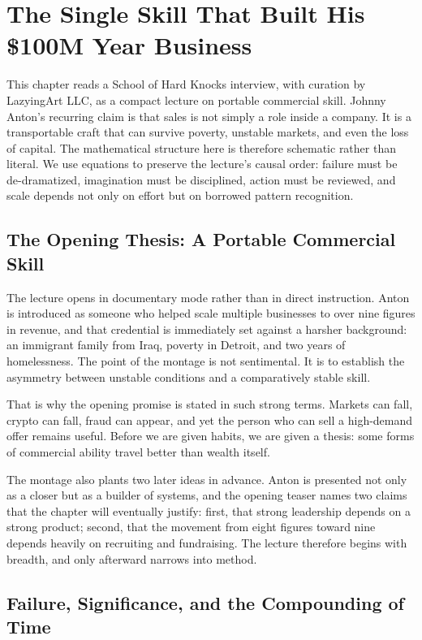 \chapter{The Single Skill That Built His \$100M Year Business}

This chapter reads a School of Hard Knocks interview, with curation by LazyingArt LLC, as a compact lecture on portable commercial skill. Johnny Anton's recurring claim is that sales is not simply a role inside a company. It is a transportable craft that can survive poverty, unstable markets, and even the loss of capital. The mathematical structure here is therefore schematic rather than literal. We use equations to preserve the lecture's causal order: failure must be de-dramatized, imagination must be disciplined, action must be reviewed, and scale depends not only on effort but on borrowed pattern recognition.

\section{The Opening Thesis: A Portable Commercial Skill}

The lecture opens in documentary mode rather than in direct instruction. Anton is introduced as someone who helped scale multiple businesses to over nine figures in revenue, and that credential is immediately set against a harsher background: an immigrant family from Iraq, poverty in Detroit, and two years of homelessness. The point of the montage is not sentimental. It is to establish the asymmetry between unstable conditions and a comparatively stable skill.

That is why the opening promise is stated in such strong terms. Markets can fall, crypto can fall, fraud can appear, and yet the person who can sell a high-demand offer remains useful. Before we are given habits, we are given a thesis: some forms of commercial ability travel better than wealth itself.

The montage also plants two later ideas in advance. Anton is presented not only as a closer but as a builder of systems, and the opening teaser names two claims that the chapter will eventually justify: first, that strong leadership depends on a strong product; second, that the movement from eight figures toward nine depends heavily on recruiting and fundraising. The lecture therefore begins with breadth, and only afterward narrows into method.

\section{Failure, Significance, and the Compounding of Time}

